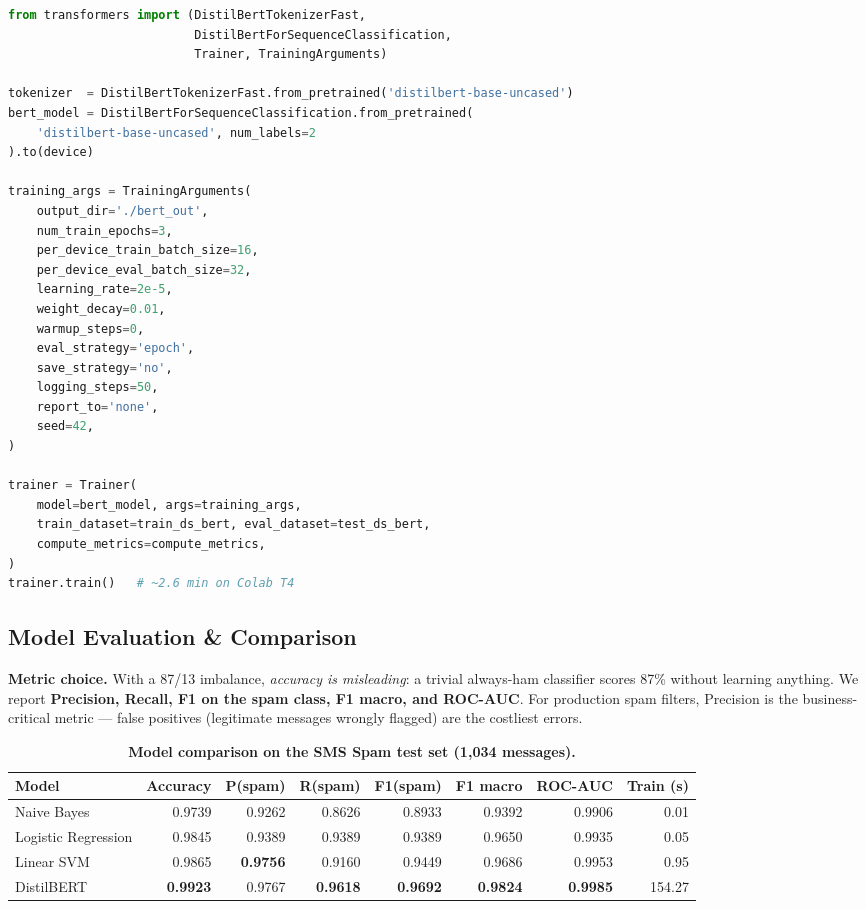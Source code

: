 \begin{lstlisting}[language=Python,caption={DistilBERT fine-tuning with HuggingFace Trainer.}]
from transformers import (DistilBertTokenizerFast,
                          DistilBertForSequenceClassification,
                          Trainer, TrainingArguments)

tokenizer  = DistilBertTokenizerFast.from_pretrained('distilbert-base-uncased')
bert_model = DistilBertForSequenceClassification.from_pretrained(
    'distilbert-base-uncased', num_labels=2
).to(device)

training_args = TrainingArguments(
    output_dir='./bert_out',
    num_train_epochs=3,
    per_device_train_batch_size=16,
    per_device_eval_batch_size=32,
    learning_rate=2e-5,
    weight_decay=0.01,
    warmup_steps=0,
    eval_strategy='epoch',
    save_strategy='no',
    logging_steps=50,
    report_to='none',
    seed=42,
)

trainer = Trainer(
    model=bert_model, args=training_args,
    train_dataset=train_ds_bert, eval_dataset=test_ds_bert,
    compute_metrics=compute_metrics,
)
trainer.train()   # ~2.6 min on Colab T4
\end{lstlisting}

\subsection{Model Evaluation \& Comparison}
\label{sec:a2_text_eval}

\textbf{Metric choice.} With a 87/13 imbalance, \emph{accuracy is misleading}: a trivial always-ham classifier scores 87\% without learning anything. We report \textbf{Precision, Recall, F1 on the spam class, F1 macro, and ROC-AUC}. For production spam filters, Precision is the business-critical metric --- false positives (legitimate messages wrongly flagged) are the costliest errors.

\begin{table}[H]
\centering
\caption{\textbf{Model comparison on the SMS Spam test set (1{,}034 messages).}}
\label{tab:a2_text_results}
\begin{tabular}{lrrrrrrr}
\hline
\textbf{Model} & \textbf{Accuracy} & \textbf{P(spam)} & \textbf{R(spam)} & \textbf{F1(spam)} & \textbf{F1 macro} & \textbf{ROC-AUC} & \textbf{Train (s)} \\
\hline
Naive Bayes         & 0.9739 & 0.9262 & 0.8626 & 0.8933 & 0.9392 & 0.9906 & 0.01 \\
Logistic Regression & 0.9845 & 0.9389 & 0.9389 & 0.9389 & 0.9650 & 0.9935 & 0.05 \\
Linear SVM          & 0.9865 & \textbf{0.9756} & 0.9160 & 0.9449 & 0.9686 & 0.9953 & 0.95 \\
DistilBERT          & \textbf{0.9923} & 0.9767 & \textbf{0.9618} & \textbf{0.9692} & \textbf{0.9824} & \textbf{0.9985} & 154.27 \\
\hline
\end{tabular}
\end{table}

